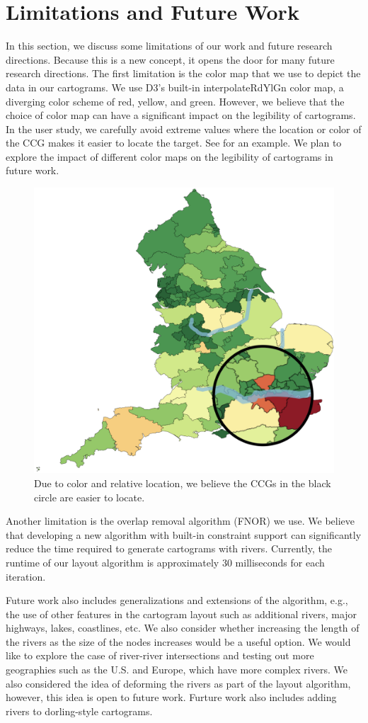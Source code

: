 \section{Limitations and Future Work}

In this section, we discuss some limitations of our work and future research directions.
Because this is a new concept, it opens the door for many future research directions.
The first limitation is the color map that we use to depict the data in our cartograms. 
We use D3's built-in interpolateRdYlGn color map, a diverging color scheme of red, yellow, and green.
However, we believe that the choice of color map can have a significant impact on the legibility of cartograms.
In the user study, we carefully avoid extreme values where the location or color of the CCG makes it easier to locate the target.
See  for an example.
We plan to explore the impact of different color maps on the legibility of cartograms in future work.

{
    \begin{figure}[tb!]
        \centering
        \includegraphics[width=0.7\columnwidth,keepaspectratio]{figure/limitations/extreme.png}
        \caption{Due to color and relative location, we believe the CCGs in the black circle are easier to locate.}
        \label{fig:extreme}
    \end{figure}
}

Another limitation is the overlap removal algorithm (FNOR) we use.
We believe that developing a new algorithm with built-in constraint support can significantly reduce the time required to generate cartograms with rivers. Currently, the runtime of our layout algorithm is approximately 30 milliseconds for each iteration.

Future work also includes generalizations and extensions of the algorithm, e.g., the use of other features in the cartogram layout such as additional rivers, major highways, lakes, coastlines, etc.
We also consider whether increasing the length of the rivers as the size of the nodes increases would be a useful option.
We would like to explore the case of river-river intersections and testing out more geographies such as the U.S. and Europe, which have more complex rivers.
We also considered the idea of deforming the rivers as part of the layout algorithm, however, this idea is open to future work.
Furture work also includes adding rivers to dorling-style cartograms.
